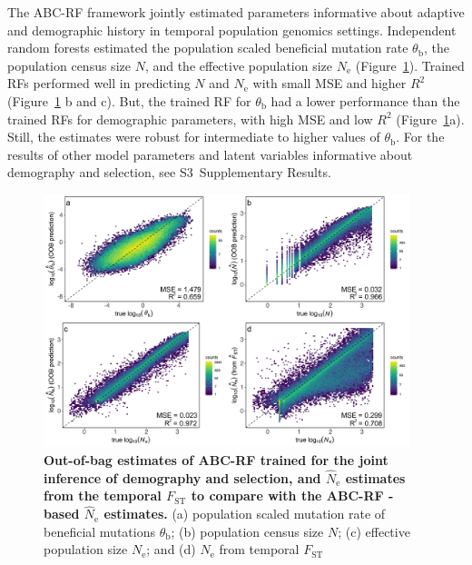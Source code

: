 \documentclass[a4paper, 12pt]{article}
\begin{document}
The ABC-RF framework jointly estimated parameters informative about adaptive and demographic history in temporal population genomics settings. Independent random forests estimated the population scaled beneficial mutation rate $\theta_\mathrm{b}$, the population census size $N$, and the effective population size $N_{\mathrm{e}}$ (Figure~\ref{fig:oob_jointDemoSel}). Trained RFs performed well in predicting $N$ and $N_{\mathrm{e}}$ with small MSE and higher $R^2$ (Figure~\ref{fig:oob_jointDemoSel} b and c). But, the trained RF for  $\theta_\mathrm{b}$ had a lower performance than the trained RFs for demographic parameters, with high MSE and low $R^2$ (Figure~\ref{fig:oob_jointDemoSel}a). Still, the estimates were robust for intermediate to higher values of $\theta_\mathrm{b}$. For the results of other model parameters and latent variables informative about demography and selection, see S3~Supplementary Results. 


\begin{figure}[ht]
  \centering
  \includegraphics[width=0.95\textwidth]{Figures/Figure2_join_demo_sel.pdf}
  \small\caption{\textbf{Out-of-bag estimates of ABC-RF trained for the joint inference of demography and selection, and $\hat N_{\mathrm{e}}$ estimates from the temporal $F_{\mathrm{ST}}$ to compare with the ABC-RF -based $\hat N_{\mathrm{e}}$ estimates.}
  (a) population scaled mutation rate of beneficial mutations $\theta_\mathrm{b}$; (b) population census size $N$; (c) effective population size $N_{\mathrm{e}}$;  and (d) $N_{\mathrm{e}}$ from temporal $F_{\mathrm{ST}}$}
  \label{fig:oob_jointDemoSel}
\end{figure}
\end{document}
